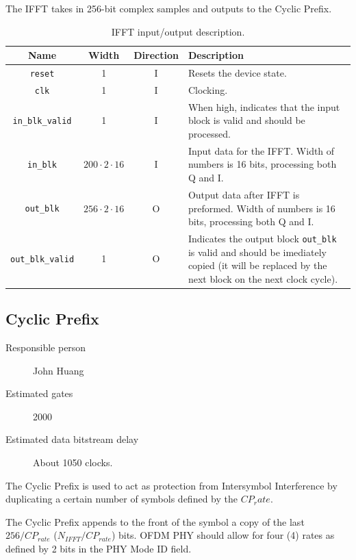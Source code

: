 \documentclass[dvips,10pt,twocolumn]{article}
\newcommand{\wire}{\texttt}
\begin{document}
	The IFFT takes in 256-bit complex samples and outputs to the Cyclic Prefix.

\begin{table}
	\begin{tabularx}{\linewidth}{c|c|c|X}
		\label{tbl:ifft-io}
			
	Name & Width & Direction & Description \\ \hline

	\wire{reset} & 1 & I & Resets the device state. \\

	\wire{clk}   & 1 & I & Clocking. \\

	\wire{in\_blk\_valid} & 1 & I & When high, indicates that the input block is
	valid and should be processed. \\

	\wire{in\_blk} & $200 \cdot 2 \cdot 16$ & I & Input data for the IFFT. Width of
	numbers is 16 bits, processing both Q and I. \\

	\wire{out\_blk} & $256 \cdot 2 \cdot 16$ & O & Output data after IFFT is preformed. Width of
	numbers is 16 bits, processing both Q and I. \\

	\wire{out\_blk\_valid} & 1 & O & Indicates the output block
	\wire{out\_blk} is valid and should be imediately copied (it will be
	replaced by the next block on the next clock cycle).

\end{tabularx}
\caption{IFFT input/output description.}
\end{table}


	\subsection{Cyclic Prefix}
	\label{sec:cyclic_prefix}
	\begin{description}
		\item[Responsible person] John Huang
		\item[Estimated gates] 2000
		\item[Estimated data bitstream delay] About 1050 clocks.
	\end{description}
	
	The Cyclic Prefix is used to act as protection from Intersymbol Interference 
	by duplicating a certain number of symbols defined by the $CP_rate$.
	
	The Cyclic Prefix appends to the front of the symbol a copy of the last
 	$256/CP_{rate}$ ($N_{IFFT}/CP_{rate}$) bits. OFDM PHY should allow for four
	(4) rates as defined by 2 bits in the PHY Mode ID field. 
	
\end{document}
